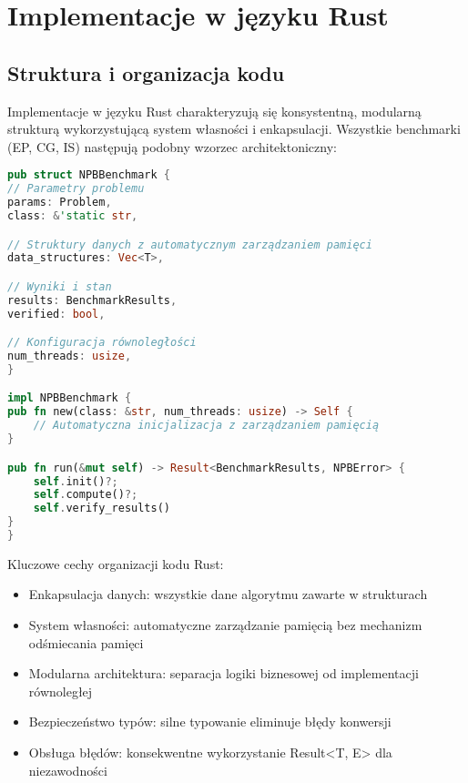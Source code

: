 \section{Implementacje w języku Rust}
\subsection{Struktura i organizacja kodu}
Implementacje w języku Rust charakteryzują się konsystentną, modularną strukturą wykorzystującą system własności i enkapsulacji. Wszystkie benchmarki (EP, CG, IS) następują podobny wzorzec architektoniczny:

\begin{lstlisting}[language=Rust, caption={Struktura kodu benchmarków w języku Rust}, label={lst:rust_structure}]
pub struct NPBBenchmark {
// Parametry problemu
params: Problem,
class: &'static str,

// Struktury danych z automatycznym zarządzaniem pamięci
data_structures: Vec<T>,

// Wyniki i stan
results: BenchmarkResults,
verified: bool,

// Konfiguracja równoległości
num_threads: usize,
}

impl NPBBenchmark {
pub fn new(class: &str, num_threads: usize) -> Self {
    // Automatyczna inicjalizacja z zarządzaniem pamięcią
}

pub fn run(&mut self) -> Result<BenchmarkResults, NPBError> {
    self.init()?;
    self.compute()?;
    self.verify_results()
}
}
\end{lstlisting}
Kluczowe cechy organizacji kodu Rust:
\begin{itemize}
    \item Enkapsulacja danych: wszystkie dane algorytmu zawarte w strukturach
    \item System własności: automatyczne zarządzanie pamięcią bez mechanizm odśmiecania pamięci 
    \item Modularna architektura: separacja logiki biznesowej od implementacji równoległej
    \item Bezpieczeństwo typów: silne typowanie eliminuje błędy konwersji
    \item Obsługa błędów: konsekwentne wykorzystanie Result<T, E> dla niezawodności
\end{itemize}


